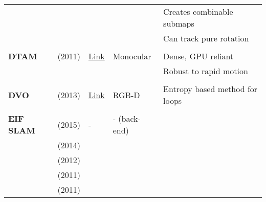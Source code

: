 \documentclass[a4paper,12pt]{scrartcl}
\begin{document}
{\begin{longtable}{l|l|l|l|l}
                           &                                   &                                                                    &                       & Creates combinable submaps\\
                           &                                   &                                                                    &                       & Can track pure rotation\\
                           &                                   &                                                                    &                       &\\
    \textbf{DTAM}          & \cite{Newcombe2011} (2011)        & {\href{https://github.com/anuranbaka/OpenDTAM}{Link}}              & Monocular             & Dense, GPU reliant\\
                           &                                   &                                                                    &                       & Robust to rapid motion\\
                           &                                   &                                                                    &                       &\\
    \textbf{DVO}           & \cite{Kerl2013} (2013)            & {\href{https://github.com/tum-vision/dvo_slam}{Link}}              & RGB-D                 & Entropy based method for loops\\
                           &                                   &                                                                    &                       &\\
    \textbf{EIF SLAM}      & \cite{Samsuri2015} (2015)         & -                                                                  & - (back-end)          &\\
                           & \cite{Sola2014} (2014)            &                                                                    &                       &\\
                           & \cite{Kurt-Yavuz2012} (2012)      &                                                                    &                       &\\
                           & \cite{He2011} (2011)              &                                                                    &                       &\\
                           & \cite{AuatCheein2011} (2011)      &                                                                    &                       &\\

\end{longtable}}
\end{document}
